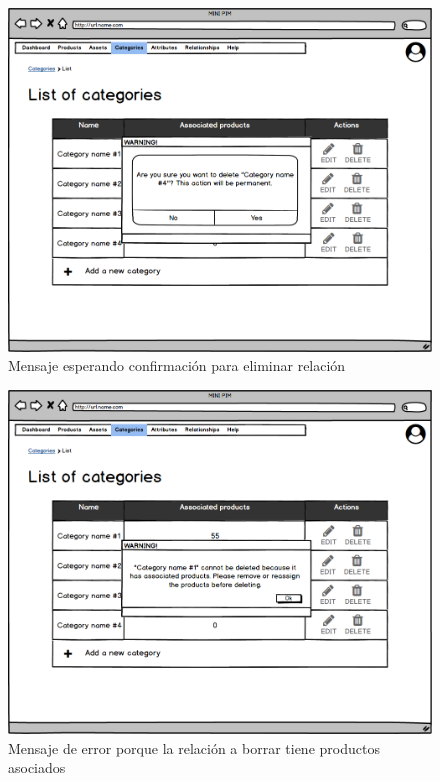 \vspace{0.20cm}

\begin{figure}[H]
    \includegraphics[width=1\linewidth]{mockups/RF4.4_1.png}
    \caption{Mensaje esperando confirmación para eliminar relación}
   \end{figure}
\vspace{1.0cm}

\begin{figure}[H]
    \includegraphics[width=1\linewidth]{mockups/RF4.4_2.png}
    \caption{Mensaje de error porque la relación a borrar tiene productos asociados}
   \end{figure}
\vspace{1.0cm}

\newpage %